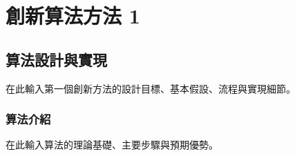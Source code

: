 \chapter{創新算法方法 1}

\section{算法設計與實現}
在此輸入第一個創新方法的設計目標、基本假設、流程與實現細節。

\subsection{算法介紹}
在此輸入算法的理論基礎、主要步驟與預期優勢。
